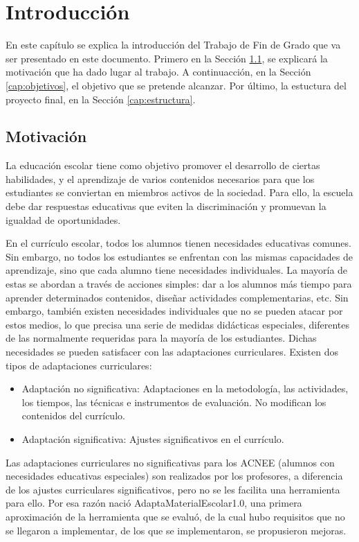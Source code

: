 \chapter{Introducción}
\label{ch:introduccion}

En este capítulo se explica la introducción del Trabajo de Fin de Grado que va ser presentado en este documento. Primero en la Sección \ref{cap:motivacio}, se explicará la motivación que ha dado lugar al trabajo. A continuacción, en la Sección \ref{cap:objetivos}, el objetivo que se pretende alcanzar. Por último, la estuctura del proyecto final, en la Sección \ref{cap:estructura}.

\section{Motivación}\label{cap:motivacio}
La educación escolar tiene como objetivo promover el desarrollo de ciertas habilidades, y el aprendizaje de varios contenidos necesarios para que los estudiantes se conviertan en miembros activos de la sociedad. Para ello, la escuela debe dar respuestas educativas que eviten la discriminación y promuevan la igualdad de oportunidades.

En el currículo escolar, todos los alumnos tienen necesidades educativas comunes. Sin embargo, no todos los estudiantes se enfrentan con las mismas capacidades de aprendizaje, sino que cada alumno tiene necesidades individuales. La mayoría de estas se abordan a través de acciones simples: dar a los alumnos más tiempo para aprender determinados contenidos, diseñar actividades complementarias, etc.  Sin embargo, también existen necesidades individuales que no se pueden atacar por estos medios, lo que precisa una serie de medidas didácticas especiales, diferentes de las normalmente requeridas para la mayoría de los estudiantes. Dichas necesidades se pueden satisfacer con las adaptaciones curriculares. Existen dos tipos de adaptaciones curriculares:
\begin{itemize}
    \item Adaptación no significativa: Adaptaciones en la metodología, las actividades, los tiempos,
    las técnicas e instrumentos de evaluación. No modifican los contenidos del currículo.  
    \item Adaptación significativa: Ajustes significativos en el currículo. 
\end{itemize}
Las adaptaciones curriculares no significativas para los ACNEE (alumnos con necesidades educativas especiales) son realizados por los profesores, a diferencia de los ajustes curriculares significativos, pero no se les facilita una herramienta para ello. Por esa razón nació AdaptaMaterialEscolar1.0, una primera aproximación de la herramienta que se evaluó, de la cual hubo requisitos que no se llegaron a implementar, de los que se implementaron, se propusieron mejoras.

